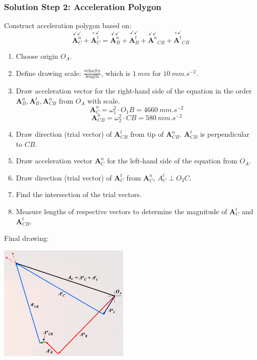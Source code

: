 \documentclass[11pt]{article}
\begin{document}
\subsubsection{Solution Step 2: Acceleration Polygon}
\label{sec:orgc29e1b4}
Construct acceleration polygon based on:
\[\overset{\checkmark \checkmark}{\boldsymbol{A}_C^n} + \overset{\times \checkmark}{\boldsymbol{A}_C^t} = \overset{\checkmark \checkmark}{\boldsymbol{A}_B^n} + \overset{\checkmark \checkmark}{\boldsymbol{A}_B^t} + \overset{\checkmark \checkmark}{\boldsymbol{A}^n}_{CB} +  \overset{\times \checkmark}{\boldsymbol{A}^t}_{CB}\]

\begin{enumerate}
\item Choose origin \(O_A\).
\item Define drawing scale: \(\frac{\text{velocity}}{\text{length}}\), which is \(\qty{1}{mm}\) for \(\qty{10}{mm.s^{-2}}\).
\item Draw acceleration vector for the right-hand side of the equation in the order \(\boldsymbol{A}_B^n, \boldsymbol{A}_B^t, \boldsymbol{A}_{CB}^n\) from \(O_A\) with scale.
\[\boldsymbol{A}_C^n = \omega_1^2 \cdot O_1 B = \qty{4660}{mm.s^{-2}}\]
\[\boldsymbol{A}_{CB}^n = \omega_2^2 \cdot CB = \qty{580}{mm.s^{-2}}\]
\item Draw direction (trial vector) of \(\boldsymbol{A}_{CB}^t\) from tip of \(\boldsymbol{A}_{CB}^n\). \(\boldsymbol{A}_{CB}^t\) is perpendicular to \(CB\).
\item Draw acceleration vector \(\boldsymbol{A}_C^n\) for the left-hand side of the equation from \(O_A\).
\item Draw direction (trial vector) of \(\boldsymbol{A}_C^t\) from \(\boldsymbol{A}_C^n\), \(A_C^t \perp O_3 C\).
\item Find the intersection of the trial vectors.
\item Measure lengths of respective vectors to determine the magnitude of \(\boldsymbol{A}_C^t\) and \(\boldsymbol{A}_{CB}^t\).
\end{enumerate}

Final drawing:
\begin{center}
\includegraphics[height=15em]{./images/4-bar-linkage-graphical-analysis-example-acceleration-polygon.png}
\end{center}
\end{document}
